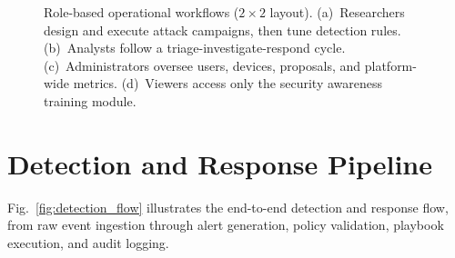 \documentclass[conference,10pt]{IEEEtran}
\begin{document}
\begin{figure}[!htbp]
{
}
\caption{Role-based operational workflows ($2 \times 2$ layout). (a)~Researchers design and execute attack campaigns, then tune detection rules. (b)~Analysts follow a triage-investigate-respond cycle. (c)~Administrators oversee users, devices, proposals, and platform-wide metrics. (d)~Viewers access only the security awareness training module.}
\label{fig:workflows}
\end{figure}

\section{Detection and Response Pipeline}
\label{sec:detection_response}

Fig.~\ref{fig:detection_flow} illustrates the end-to-end detection and response flow, from raw event ingestion through alert generation, policy validation, playbook execution, and audit logging.
\end{document}
